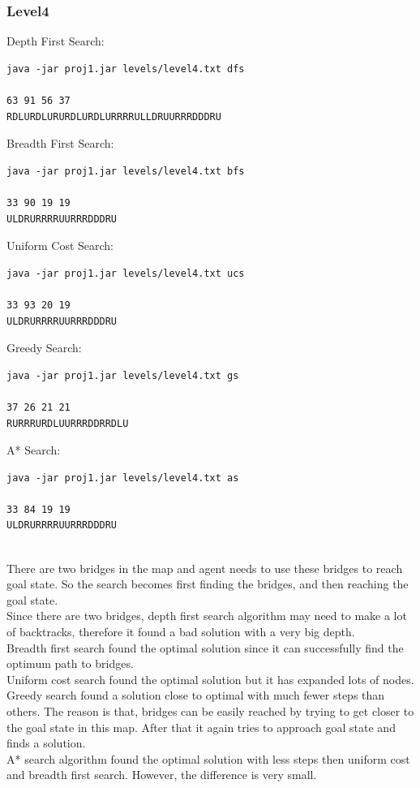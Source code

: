 \documentclass[12pt]{article}
\begin{document}
\subsubsection*{Level4}
Depth First Search:
\begin{lstlisting}[style=terminalstyle]
java -jar proj1.jar levels/level4.txt dfs

63 91 56 37
RDLURDLURURDLURDLURRRRULLDRUURRRDDDRU
\end{lstlisting}
Breadth First Search:
\begin{lstlisting}[style=terminalstyle]
java -jar proj1.jar levels/level4.txt bfs

33 90 19 19
ULDRURRRRUURRRDDDRU
\end{lstlisting}
Uniform Cost Search:
\begin{lstlisting}[style=terminalstyle]
java -jar proj1.jar levels/level4.txt ucs

33 93 20 19
ULDRURRRRUURRRDDDRU
\end{lstlisting}
Greedy Search:
\begin{lstlisting}[style=terminalstyle]
java -jar proj1.jar levels/level4.txt gs

37 26 21 21
RURRRURDLUURRRDDRRDLU
\end{lstlisting}
A* Search:
\begin{lstlisting}[style=terminalstyle]
java -jar proj1.jar levels/level4.txt as

33 84 19 19
ULDRURRRRUURRRDDDRU
\end{lstlisting}
\\
There are two bridges in the map and agent needs to use these bridges to reach goal state. So the search becomes first finding the bridges, and then reaching the goal state. \\
Since there are two bridges, depth first search algorithm may need to make a lot of backtracks, therefore it found a bad solution with a very big depth.\\
Breadth first search found the optimal solution since it can successfully find the optimum path to bridges.\\
Uniform cost search found the optimal solution but it has expanded lots of nodes.\\
Greedy search found a solution close to optimal with much fewer steps than others. The reason is that, bridges can be easily reached by trying to get closer to the goal state in this map. After that it again tries to approach goal state and finds a solution.\\
A* search algorithm found the optimal solution with less steps then uniform cost and breadth first search. However, the difference is very small.
\end{document}
